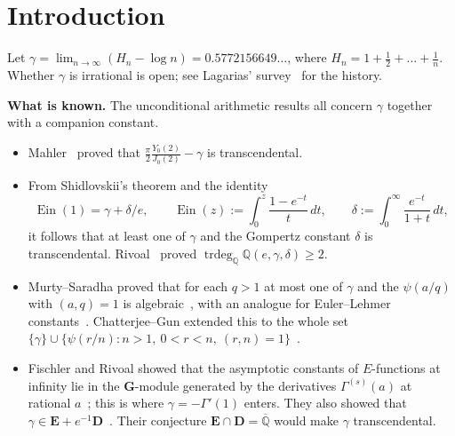 \documentclass[11pt,a4paper]{article}
\theoremstyle{definition}
\theoremstyle{remark}
\newcommand{\Q}{\mathbb Q}
\newcommand{\Qbar}{\overline{\mathbb Q}}
\newcommand{\bG}{\mathbf G}
\newcommand{\bE}{\mathbf E}
\newcommand{\bD}{\mathbf D}
\DeclareMathOperator{\Ein}{Ein}
\numberwithin{equation}{section}
\begin{document}
\begin{abstract}
Two numerical studies are included. The first views Aptekarev's integer forms inside the denominator-free lattice: their gcd is the trivial factor $n!/d_n$ times a small integer (between $3$ and $39591$ for $n=20,30,\dots,300$), so no hidden arithmetic gain appears. The second treats the moments of the Dickman distribution. Their denominators are bounded by $e^{k\log k+O(k)}$, and numerically they are of that order.

\emph{Nothing in this note proves or disproves the irrationality of $\gamma$.}
\end{abstract}





\section{Introduction}

Let $\gamma=\lim_{n\to\infty}(H_n-\log n)=0.5772156649\ldots$, where $H_n=1+\frac12+\dots+\frac1n$. Whether $\gamma$ is irrational is open; see Lagarias' survey~\cite{p4:Lag} for the history.

\medskip\noindent\textbf{What is known.} The unconditional arithmetic results all concern $\gamma$ together with a companion constant.
\begin{itemize}[leftmargin=2em]
\item Mahler~\cite{p4:Mah} proved that $\frac{\pi}{2}\frac{Y_0(2)}{J_0(2)}-\gamma$ is transcendental.
\item From Shidlovskii's theorem and the identity
\begin{equation}\label{p4:eq:hardy}
\Ein(1)=\gamma+\delta/e,\qquad \Ein(z):=\int_0^z\frac{1-e^{-t}}{t}\,dt,\qquad \delta:=\int_0^\infty\frac{e^{-t}}{1+t}\,dt ,
\end{equation}
it follows that at least one of $\gamma$ and the Gompertz constant $\delta$ is transcendental. Rivoal~\cite{p4:Riv12} proved $\operatorname{trdeg}_\Q\Q(e,\gamma,\delta)\ge2$.
\item Murty--Saradha proved that for each $q>1$ at most one of $\gamma$ and the $\psi(a/q)$ with $(a,q)=1$ is algebraic~\cite{p4:MS07}, with an analogue for Euler--Lehmer constants~\cite{p4:MS10}. Chatterjee--Gun extended this to the whole set $\{\gamma\}\cup\{\psi(r/n):n>1,\ 0<r<n,\ (r,n)=1\}$~\cite{p4:CG}.
\item Fischler and Rivoal showed that the asymptotic constants of $E$-functions at infinity lie in the $\bG$-module generated by the derivatives $\Gamma^{(s)}(a)$ at rational $a$~\cite{p4:FR16}; this is where $\gamma=-\Gamma'(1)$ enters. They also showed that $\gamma\in\bE+e^{-1}\bD$~\cite{p4:FR24}. Their conjecture $\bE\cap\bD=\Qbar$ would make $\gamma$ transcendental.
\end{itemize}
\end{document}
